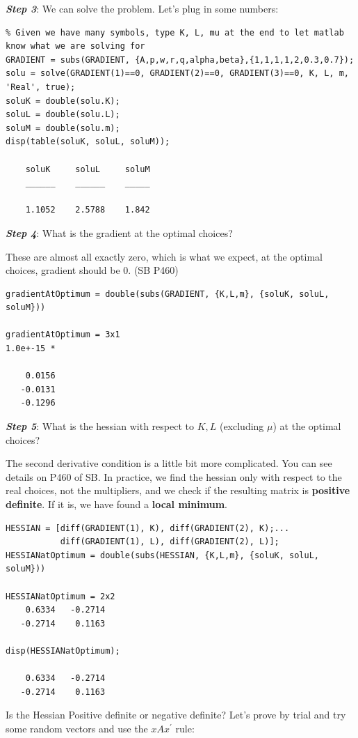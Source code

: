 \documentclass[
]{book}
\begin{document}
\textbf{\emph{Step 3}}: We can solve the problem. Let's plug in some numbers:

\begin{verbatim}
% Given we have many symbols, type K, L, mu at the end to let matlab know what we are solving for
GRADIENT = subs(GRADIENT, {A,p,w,r,q,alpha,beta},{1,1,1,1,2,0.3,0.7});
solu = solve(GRADIENT(1)==0, GRADIENT(2)==0, GRADIENT(3)==0, K, L, m, 'Real', true);
soluK = double(solu.K);
soluL = double(solu.L);
soluM = double(solu.m);
disp(table(soluK, soluL, soluM));

    soluK     soluL     soluM
    ______    ______    _____

    1.1052    2.5788    1.842
\end{verbatim}

\textbf{\emph{Step 4}}: What is the gradient at the optimal choices?

These are almost all exactly zero, which is what we expect, at the
optimal choices, gradient should be 0. (SB P460)

\begin{verbatim}
gradientAtOptimum = double(subs(GRADIENT, {K,L,m}, {soluK, soluL, soluM}))

gradientAtOptimum = 3x1    
1.0e+-15 *

    0.0156
   -0.0131
   -0.1296
\end{verbatim}

\textbf{\emph{Step 5}}: What is the hessian with respect to \(K,L\) (excluding
\(\mu\)) at the optimal choices?

The second derivative condition is a little bit more complicated. You
can see details on P460 of SB. In practice, we find the hessian only
with respect to the real choices, not the multipliers, and we check if
the resulting matrix is \textbf{positive definite}. If it is, we have found a
\textbf{local minimum}.

\begin{verbatim}
HESSIAN = [diff(GRADIENT(1), K), diff(GRADIENT(2), K);...
           diff(GRADIENT(1), L), diff(GRADIENT(2), L)];
HESSIANatOptimum = double(subs(HESSIAN, {K,L,m}, {soluK, soluL, soluM}))

HESSIANatOptimum = 2x2    
    0.6334   -0.2714
   -0.2714    0.1163

disp(HESSIANatOptimum);

    0.6334   -0.2714
   -0.2714    0.1163
\end{verbatim}

Is the Hessian Positive definite or negative definite? Let's prove by
trial and try some random vectors and use the \(xAx^{\prime }\) rule:
\end{document}
